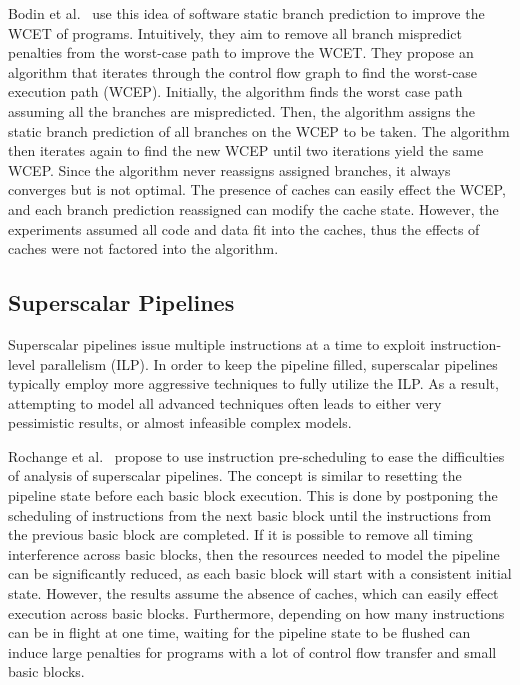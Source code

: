 Bodin et al.~\cite{Bodin2005staticbranch} use this idea of software static branch prediction to improve the WCET of programs.
Intuitively, they aim to remove all branch mispredict penalties from the worst-case path to improve the WCET. 
They propose an algorithm that iterates through the control flow graph to find the worst-case execution path (WCEP). 
Initially, the algorithm finds the worst case path assuming all the branches are mispredicted. 
Then, the algorithm assigns the static branch prediction of all branches on the WCEP to be taken.
The algorithm then iterates again to find the new WCEP until two iterations yield the same WCEP.
Since the algorithm never reassigns assigned branches, it always converges but is not optimal.
The presence of caches can easily effect the WCEP, and each branch prediction reassigned can modify the cache state.
However, the experiments assumed all code and data fit into the caches, thus the effects of caches were not factored into the algorithm.

\subsection{Superscalar Pipelines}
\label{sec:RTSuperscale}
Superscalar pipelines issue multiple instructions at a time to exploit instruction-level parallelism (ILP). 
In order to keep the pipeline filled, superscalar pipelines typically employ more aggressive techniques to fully utilize the ILP. 
As a result, attempting to model all advanced techniques often leads to either very pessimistic results, or almost infeasible complex models.

Rochange et al.~\cite{Rochange2005superscalar} propose to use instruction pre-scheduling to ease the difficulties of analysis of superscalar pipelines.  
The concept is similar to resetting the pipeline state before each basic block execution. 
This is done by postponing the scheduling of instructions from the next basic block until the instructions from the previous basic block are completed.
If it is possible to remove all timing interference across basic blocks, then the resources needed to model the pipeline can be significantly reduced, as each basic block will start with a consistent initial state.
However, the results assume the absence of caches, which can easily effect execution across basic blocks.  
Furthermore, depending on how many instructions can be in flight at one time, waiting for the pipeline state to be flushed can induce large penalties for programs with a lot of control flow transfer and small basic blocks. 

